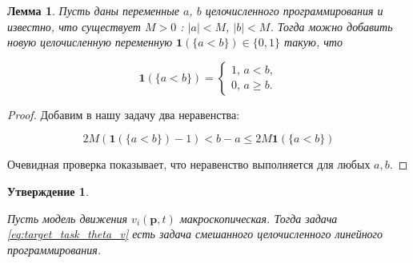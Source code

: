 \documentclass[12pt, a4paper]{article}
\newtheorem{state}{Утверждение}[section]
\newtheorem{lemma}{Лемма}[section]
\begin{document}
\begin{lemma}
	\label{lemma:lt}
	Пусть даны переменные $a$, $b$ целочисленного программирования и известно, что существует $M > 0$ : $|a| < M$, $|b| < M$. Тогда можно добавить новую целочисленную переменную $\textbf{1} (\{a < b\}) \in \{0, 1\}$ такую, что
	
	\begin{equation*}
		\textbf{1} (\{a < b\}) = 
		\begin{cases}
			1,\, a < b,
			\\
			0,\, a \ge b.
		\end{cases}
	\end{equation*}

\end{lemma}

\begin{proof}
	Добавим в нашу задачу два неравенства:
	
	$$ 2M (\textbf{1} (\{a < b\}) - 1) < b - a \le 2M\textbf{1} (\{a < b\}) $$
	
	Очевидная проверка показывает, что неравенство выполняется для любых $a, b$.
	
	
\end{proof}

\begin{state}
	
	\label{state:lin_prog}
	
	Пусть модель движения $ v_i(\textbf{p}, t)$ макроскопическая. Тогда задача \eqref{eq:target_task_theta_v} есть задача смешанного целочисленного линейного программирования.
\end{state}
\end{document}

